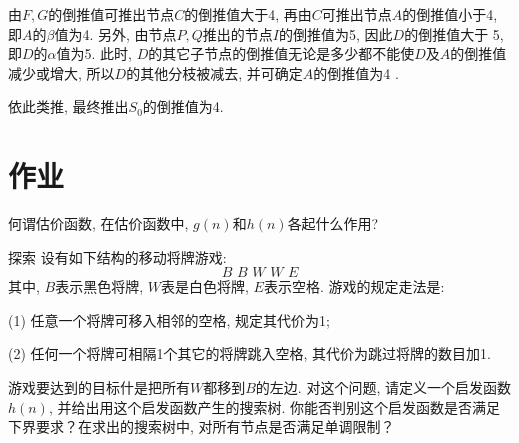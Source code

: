 由$F,G$的倒推值可推出节点$C$的倒推值大于4, 再由$C$可推出节点$A$的倒推值小于4, 即$A$的$\beta$值为4. 另外, 由节点$P,Q$推出的节点$I$的倒推值为5, 因此$D$的倒推值大于 5, 即$D$的$\alpha$值为5.
此时, $D$的其它子节点的倒推值无论是多少都不能使$D$及$A$的倒推值减少或增大, 所以$D$的其他分枝被减去, 并可确定$A$的倒推值为4 .

依此类推, 最终推出$S_0$的倒推值为4.
\section{作业}
\begin{think}
何谓估价函数, 在估价函数中, $g(n)$和$h(n)$各起什么作用?
\end{think}
\begin{custom}[explorecolor]{探索}
设有如下结构的移动将牌游戏:
$$B\,\,	B\,\,		W\,\,		W\,\,		E$$
其中, $B$表示黑色将牌, $W$表是白色将牌, $E$表示空格. 游戏的规定走法是:

(1) 任意一个将牌可移入相邻的空格, 规定其代价为1;

(2) 任何一个将牌可相隔1个其它的将牌跳入空格, 其代价为跳过将牌的数目加1.

游戏要达到的目标什是把所有$W$都移到$B$的左边. 对这个问题, 请定义一个启发函数$h(n)$, 并给出用这个启发函数产生的搜索树. 你能否判别这个启发函数是否满足下界要求？在求出的搜索树中, 对所有节点是否满足单调限制？
\end{custom}


